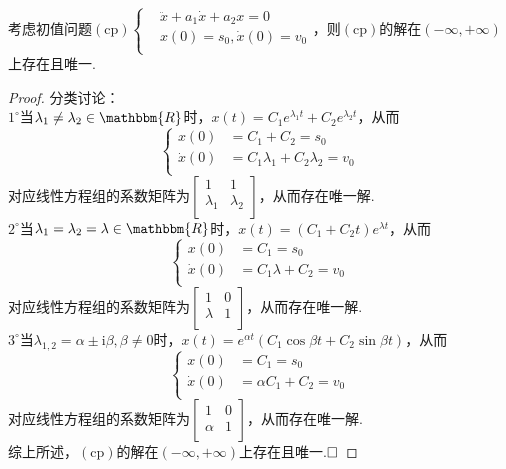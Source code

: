 \documentclass{ctexart}
\begin{document}
\begin{theorem}[二阶常系数齐次方程初值问题的解的存在唯一性]
考虑初值问题$(\mathrm{cp})\left\{\begin{aligned}&\ddot{x}+a_{1}\dot{x}+a_{2}x=0\\&x(0)=s_{0},\dot{x}(0)=v_{0}\\\end{aligned}\right.$，则$(\mathrm{cp})$的解在$(-\infty,+\infty)$上存在且唯一.
\end{theorem}

\begin{proof}
分类讨论：\\
$1^{\circ}$当$\lambda_{1}\neq \lambda_{2}\in\mathbbm{R}$时，$x(t)=C_{1}e^{\lambda_{1}t}+C_{2}e^{\lambda_{2}t}$，从而
$$\left\{\begin{aligned}x(0)&=C_{1}+C_{2}=s_{0}\\ \dot{x}(0)&=C_{1}\lambda_{1}+C_{2}\lambda_{2}=v_{0}\\\end{aligned}\right.$$
对应线性方程组的系数矩阵为$\begin{bmatrix}1&1\\ \lambda_{1}&\lambda_{2}\\\end{bmatrix}$，从而存在唯一解.\\
$2^{\circ}$当$\lambda_{1}= \lambda_{2}=\lambda\in\mathbbm{R}$时，$x(t)=(C_{1}+C_{2}t)e^{\lambda t}$，从而
$$\left\{\begin{aligned}x(0)&=C_{1}=s_{0}\\ \dot{x}(0)&=C_{1}\lambda+C_{2}=v_{0}\\\end{aligned}\right.$$
对应线性方程组的系数矩阵为$\begin{bmatrix}1&0\\ \lambda&1\\\end{bmatrix}$，从而存在唯一解.\\
$3^{\circ}$当$\lambda_{1,2}=\alpha\pm\mathrm{i}\beta,\beta\neq 0$时，$x(t)=e^{\alpha t}\left(C_{1}\cos{\beta t}+C_{2}\sin{\beta t}\right)$，从而
$$\left\{\begin{aligned}x(0)&=C_{1}=s_{0}\\ \dot{x}(0)&=\alpha C_{1}+C_{2}=v_{0}\\\end{aligned}\right.$$
对应线性方程组的系数矩阵为$\begin{bmatrix}1&0\\ \alpha&1\\\end{bmatrix}$，从而存在唯一解.\\
综上所述，$(\mathrm{cp})$的解在$(-\infty,+\infty)$上存在且唯一.$\hfill{\square}$
\end{proof}
\end{document}
